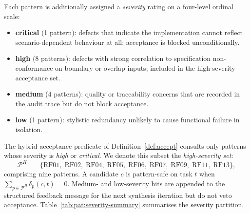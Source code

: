 Each pattern is additionally assigned a \emph{severity} rating on a four-level
ordinal scale:

\begin{itemize}
  \item \textbf{critical} (1 pattern): defects that indicate the implementation
        cannot reflect scenario-dependent behaviour at all; acceptance is
        blocked unconditionally.
  \item \textbf{high} (8 patterns): defects with strong correlation to
        specification non-conformance on boundary or overlap inputs; included
        in the high-severity acceptance set.
  \item \textbf{medium} (4 patterns): quality or traceability concerns that are
        recorded in the audit trace but do not block acceptance.
  \item \textbf{low} (1 pattern): stylistic redundancy unlikely to cause
        functional failure in isolation.
\end{itemize}

The hybrid acceptance predicate of Definition~\ref{def:accept} consults only
patterns whose severity is \emph{high} or \emph{critical}.  We denote this
subset the \emph{high-severity set}:
\begin{equation}
  \mathcal{P}^H \;=\;
    \{\text{RF01},\;\text{RF02},\;\text{RF04},\;\text{RF05},\;\text{RF06},\;
      \text{RF07},\;\text{RF09},\;\text{RF11},\;\text{RF13}\},
  \label{eq:app:high-sev}
\end{equation}
comprising nine patterns.  A candidate $c$ is pattern-safe on task $t$ when
$\sum_{p \in \mathcal{P}^H} \delta_p(c, t) = 0$.  Medium- and low-severity
hits are appended to the structured feedback message for the next synthesis
iteration but do not veto acceptance.  Table~\ref{tab:pat:severity-summary}
summarises the severity partition.

\begin{table}[htbp]
  \caption{Severity partition of the pattern catalogue ($|\mathcal{P}| = 14$).}
  \label{tab:pat:severity-summary}
  \centering
\end{table}

